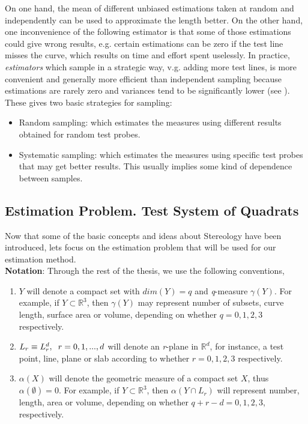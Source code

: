On one hand, the mean of different unbiased estimations taken at random and independently can be used to approximate the length better.
On the other hand, one inconvenience of the following estimator is that some of those estimations could give wrong results, e.g. certain estimations can be zero if the test line misses the curve, which results on time and effort spent uselessly. 
In practice, \textit{estimators} which sample in a strategic way, v.g. adding more test lines, is more convenient and generally more efficient than independent sampling because estimations are rarely zero and variances tend to be significantly lower (see \cite{CO.IAS.17.Hist.pdf}).\\

These gives two basic strategies for sampling:
\begin{itemize}
    \item Random sampling: which estimates the measures using different results obtained for random test probes.
    \item Systematic sampling:  which estimates the measures using specific test probes that may get better results. This usually implies some kind of dependence between samples.
\end{itemize}
\subsection{Estimation Problem. Test System of Quadrats}
Now that some of the basic concepts and ideas about Stereology have been introduced, lets focus on the estimation problem that will be used for our estimation method.\\
\textbf{Notation}: 
Through the rest of the thesis, we use the following conventions,
\begin{enumerate}
    \item $Y$ will denote a compact set with $dim(Y)=q$ and \textit{q}-measure $\gamma(Y)$. For example, if $Y\subset \mathbb{R}^3$, then $\gamma(Y)$ may represent number of subsets, curve length, surface area or volume, depending on whether $q=0,1,2,3$ respectively.
    \item $L_r\equiv L_r^d, \hspace{2mm} r=0,1,...,d$ will denote an \textit{r}-plane in $\mathbb{R}^d$, for instance, a test point, line, plane or slab according to whether $r=0,1,2,3$ respectively.
    \item $\alpha(X)$ will denote the geometric measure of a compact set $X$, thus $\alpha(\emptyset)=0$. For example, if $Y\subset \mathbb{R}^3$, then $\alpha(Y\cap L_r)$ will represent number, length, area or volume, depending on whether $q+r-d=0,1,2,3$, respectively.
\end{enumerate}

